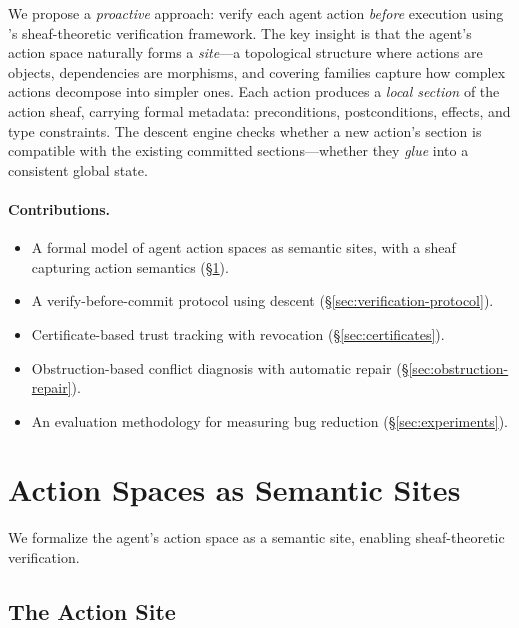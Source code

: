 \documentclass[11pt]{article}
\begin{document}
We propose a \emph{proactive} approach: verify each agent action
\emph{before} execution using \JuGeo's sheaf-theoretic verification
framework.  The key insight is that the agent's action space naturally
forms a \emph{site}---a topological structure where actions are
objects, dependencies are morphisms, and covering families capture
how complex actions decompose into simpler ones.  Each action produces
a \emph{local section} of the action sheaf, carrying formal metadata:
preconditions, postconditions, effects, and type constraints.  The
descent engine checks whether a new action's section is compatible
with the existing committed sections---whether they \emph{glue} into
a consistent global state.

\paragraph{Contributions.}
\begin{itemize}
  \item A formal model of agent action spaces as semantic sites, with
    a sheaf capturing action semantics (\S\ref{sec:action-site}).
  \item A verify-before-commit protocol using descent
    (\S\ref{sec:verification-protocol}).
  \item Certificate-based trust tracking with revocation
    (\S\ref{sec:certificates}).
  \item Obstruction-based conflict diagnosis with automatic repair
    (\S\ref{sec:obstruction-repair}).
  \item An evaluation methodology for measuring bug
    reduction (\S\ref{sec:experiments}).
\end{itemize}


\section{Action Spaces as Semantic Sites}\label{sec:action-site}

We formalize the agent's action space as a semantic site, enabling
sheaf-theoretic verification.

\subsection{The Action Site}\label{subsec:action-site-def}
\end{document}
